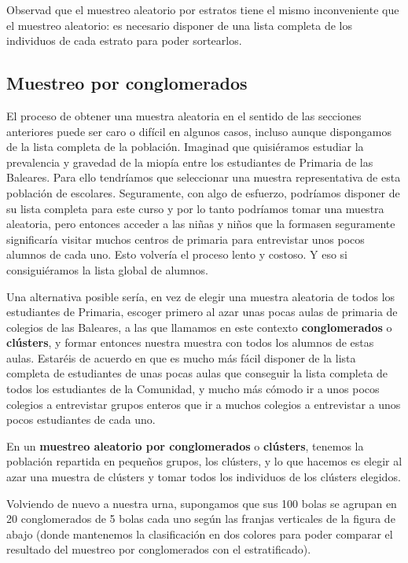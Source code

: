 \documentclass[
  spanish,
  letterpaper,
  DIV=11,
  numbers=noendperiod]{scrreprt}
\begin{document}
Observad que el muestreo aleatorio por estratos tiene el mismo
inconveniente que el muestreo aleatorio: es necesario disponer de una
lista completa de los individuos de cada estrato para poder sortearlos.

\subsection{Muestreo por
conglomerados}\label{muestreo-por-conglomerados}

El proceso de obtener una muestra aleatoria en el sentido de las
secciones anteriores puede ser caro o difícil en algunos casos, incluso
aunque dispongamos de la lista completa de la población. Imaginad que
quisiéramos estudiar la prevalencia y gravedad de la miopía entre los
estudiantes de Primaria de las Baleares. Para ello tendríamos que
seleccionar una muestra representativa de esta población de escolares.
Seguramente, con algo de esfuerzo, podríamos disponer de su lista
completa para este curso y por lo tanto podríamos tomar una muestra
aleatoria, pero entonces acceder a las niñas y niños que la formasen
seguramente significaría visitar muchos centros de primaria para
entrevistar unos pocos alumnos de cada uno. Esto volvería el proceso
lento y costoso. Y eso si consiguiéramos la lista global de alumnos.

Una alternativa posible sería, en vez de elegir una muestra aleatoria de
todos los estudiantes de Primaria, escoger primero al azar unas pocas
aulas de primaria de colegios de las Baleares, a las que llamamos en
este contexto \textbf{conglomerados} o \textbf{clústers}, y formar
entonces nuestra muestra con todos los alumnos de estas aulas. Estaréis
de acuerdo en que es mucho más fácil disponer de la lista completa de
estudiantes de unas pocas aulas que conseguir la lista completa de todos
los estudiantes de la Comunidad, y mucho más cómodo ir a unos pocos
colegios a entrevistar grupos enteros que ir a muchos colegios a
entrevistar a unos pocos estudiantes de cada uno.

En un \textbf{muestreo aleatorio por conglomerados} o \textbf{clústers},
tenemos la población repartida en pequeños grupos, los clústers, y lo
que hacemos es elegir al azar una muestra de clústers y tomar todos los
individuos de los clústers elegidos.

Volviendo de nuevo a nuestra urna, supongamos que sus 100 bolas se
agrupan en 20 conglomerados de 5 bolas cada uno según las franjas
verticales de la figura de abajo (donde mantenemos la clasificación en
dos colores para poder comparar el resultado del muestreo por
conglomerados con el estratificado).
\end{document}
